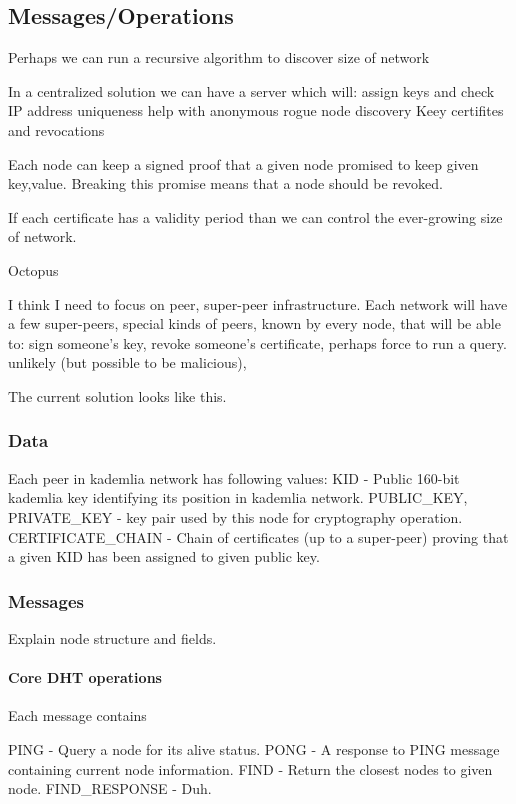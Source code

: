 \subsection{Messages/Operations}

Perhaps we can run a recursive algorithm to discover size of network

In a centralized solution we can have a server which will:
  assign keys and check IP address uniqueness
  help with anonymous rogue node discovery
  Keey certifites and revocations

Each node can keep a signed proof that a given node promised to keep given
key,value. Breaking this promise means that a node should be revoked.

If each certificate has a validity period than we can control the ever-growing
size of network.

Octopus

I think I need to focus on peer, super-peer infrastructure. Each network will
have a few super-peers, special kinds of peers, known by every node, that will
be able to: sign someone's key, revoke someone's certificate, perhaps force to
run a query.
unlikely (but possible to be malicious), 

The current solution looks like this.

\subsubsection{Data}
Each peer in kademlia network has following values:
KID - Public 160-bit kademlia key identifying its position in kademlia network.
PUBLIC\_KEY, PRIVATE\_KEY - key pair used by this node for cryptography operation.
CERTIFICATE\_CHAIN - Chain of certificates (up to a super-peer) proving that a
given KID has been assigned to given public key.

\subsubsection{Messages}
Explain node structure and fields.

\paragraph{Core DHT operations}
Each message contains

PING - Query a node for its alive status. 
PONG - A response to PING message containing current node information.
FIND - Return the closest nodes to given node.
FIND\_RESPONSE - Duh.

